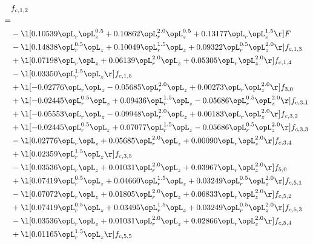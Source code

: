 \begin{alignat}{2} 
\label{eq:f_12_2} 
& f_{c,1,2} \nonumber \\ 
 = \\ 
& - \l[  0.10539 \opL_r \opL_z^{0.5} +  0.10862 \opL_r^{2.0} \opL_z^{0.5} +  0.13177 \opL_r \opL_z^{1.5}  \r] F \nonumber \\ 
& - \l[  0.14838 \opL_r^{0.5} \opL_z +  0.10049 \opL_r^{1.5} \opL_z +  0.09322 \opL_r^{0.5} \opL_z^{2.0}  \r] f_{c,1,3} \nonumber \\ 
& + \l[  0.07198 \opL_r \opL_z +  0.06139 \opL_r^{2.0} \opL_z +  0.05305 \opL_r \opL_z^{2.0}  \r] f_{c,1,4} \nonumber \\ 
& - \l[  0.03350 \opL_r^{1.5} \opL_z  \r] f_{c,1,5} \nonumber \\ 
& + \l[  -0.02776 \opL_r \opL_z   -0.05685 \opL_r^{2.0} \opL_z +  0.00273 \opL_r \opL_z^{2.0}  \r] f_{3,0} \nonumber \\ 
& + \l[  -0.02445 \opL_r^{0.5} \opL_z +  0.09436 \opL_r^{1.5} \opL_z   -0.05686 \opL_r^{0.5} \opL_z^{2.0}  \r] f_{c,3,1} \nonumber \\ 
& + \l[  -0.05553 \opL_r \opL_z   -0.09948 \opL_r^{2.0} \opL_z +  0.00183 \opL_r \opL_z^{2.0}  \r] f_{c,3,2} \nonumber \\ 
& + \l[  -0.02445 \opL_r^{0.5} \opL_z +  0.07077 \opL_r^{1.5} \opL_z   -0.05686 \opL_r^{0.5} \opL_z^{2.0}  \r] f_{c,3,3} \nonumber \\ 
& - \l[  0.02776 \opL_r \opL_z +  0.05685 \opL_r^{2.0} \opL_z +  0.00090 \opL_r \opL_z^{2.0}  \r] f_{c,3,4} \nonumber \\ 
& + \l[  0.02359 \opL_r^{1.5} \opL_z  \r] f_{c,3,5} \nonumber \\ 
& - \l[  0.03536 \opL_r \opL_z +  0.01031 \opL_r^{2.0} \opL_z +  0.03967 \opL_r \opL_z^{2.0}  \r] f_{5,0} \nonumber \\ 
& + \l[  0.07419 \opL_r^{0.5} \opL_z +  0.04660 \opL_r^{1.5} \opL_z +  0.03249 \opL_r^{0.5} \opL_z^{2.0}  \r] f_{c,5,1} \nonumber \\ 
& - \l[  0.07072 \opL_r \opL_z +  0.01805 \opL_r^{2.0} \opL_z +  0.06833 \opL_r \opL_z^{2.0}  \r] f_{c,5,2} \nonumber \\ 
& + \l[  0.07419 \opL_r^{0.5} \opL_z +  0.03495 \opL_r^{1.5} \opL_z +  0.03249 \opL_r^{0.5} \opL_z^{2.0}  \r] f_{c,5,3} \nonumber \\ 
& - \l[  0.03536 \opL_r \opL_z +  0.01031 \opL_r^{2.0} \opL_z +  0.02866 \opL_r \opL_z^{2.0}  \r] f_{c,5,4} \nonumber \\ 
& + \l[  0.01165 \opL_r^{1.5} \opL_z  \r] f_{c,5,5} \nonumber \\ 

\end{alignat}
